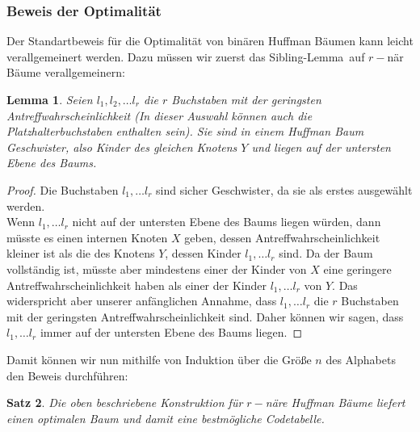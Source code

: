 \documentclass[a4paper,10pt,ngerman]{scrartcl}
\newtheorem{satz}{Satz}
\newtheorem{lemma}[satz]{Lemma}
\begin{document}
    \subsubsection{Beweis der Optimalität}
    Der Standartbeweis für die Optimalität von binären Huffman Bäumen kann leicht verallgemeinert werden.
    Dazu müssen wir zuerst das \glqq Sibling-Lemma\grqq~auf $r-$när Bäume verallgemeinern:
    \begin{lemma}
        Seien $l_1, l_2, \dots l_r$ die $r$ Buchstaben mit der geringsten Antreffwahrscheinlichkeit (In dieser Auswahl können auch die Platzhalterbuchstaben enthalten sein).
        Sie sind in einem Huffman Baum \glqq Geschwister\grqq, also Kinder des gleichen Knotens $Y$ und liegen auf der untersten Ebene des Baums.
    \end{lemma}
    \begin{proof}
        Die Buchstaben $l_1, \dots l_r$ sind sicher Geschwister, da sie als erstes ausgewählt werden. \\
        Wenn $l_1, \dots l_r$ nicht auf der untersten Ebene des Baums liegen würden, dann müsste es einen internen Knoten $X$ geben, dessen Antreffwahrscheinlichkeit kleiner ist als die des Knotens $Y$, dessen Kinder $l_1, \dots l_r$ sind.
        Da der Baum vollständig ist, müsste aber mindestens einer der Kinder von $X$ eine geringere Antreffwahrscheinlichkeit haben als einer der Kinder  $l_1, \dots l_r$ von $Y$.
        Das widerspricht aber unserer anfänglichen Annahme, dass $l_1, \dots l_r$ die $r$ Buchstaben mit der geringsten Antreffwahrscheinlichkeit sind. Daher können wir sagen, dass $l_1, \dots l_r$ immer auf der untersten Ebene des Baums liegen.
    \end{proof}
    Damit können wir nun mithilfe von Induktion über die Größe $n$ des Alphabets den Beweis durchführen:
    \begin{satz}
        Die oben beschriebene Konstruktion für $r-$näre Huffman Bäume liefert einen optimalen Baum und damit eine bestmögliche Codetabelle.
    \end{satz}
\end{document}
